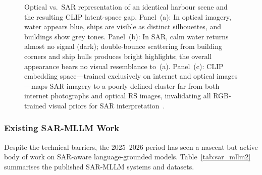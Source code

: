\begin{figure}[h]
\caption{Optical vs.\ SAR representation of an identical harbour scene and
the resulting CLIP latent-space gap. Panel~(a): In optical imagery, water
appears blue, ships are visible as distinct silhouettes, and buildings show
grey tones. Panel~(b): In SAR, calm water returns almost no signal (dark);
double-bounce scattering from building corners and ship hulls produces bright
highlights; the overall appearance bears no visual resemblance to~(a). Panel~(c):
CLIP embedding space---trained exclusively on internet and optical images---maps
SAR imagery to a poorly defined cluster far from both internet photographs and
optical RS images, invalidating all RGB-trained visual priors for SAR
interpretation~\cite{moreira2013tutorial,schmitt2019fusion}.}\label{fig:sar_vs_opt}
\end{figure}

\subsubsection{Existing SAR-MLLM Work}\label{sec5:sarexisting}

Despite the technical barriers, the 2025--2026 period has seen a nascent but
active body of work on SAR-aware language-grounded models. Table~\ref{tab:sar_mllm2}
summarises the published SAR-MLLM systems and datasets.

